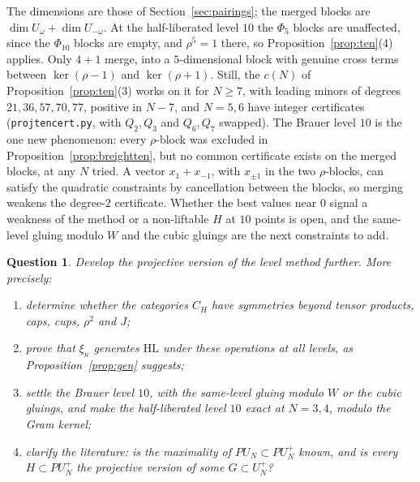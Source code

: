\documentclass[11pt]{amsart}
\newtheorem{question}[theorem]{Question}
\theoremstyle{definition}
\theoremstyle{remark}
\theoremstyle{plain}
\numberwithin{equation}{section}
\numberwithin{table}{section}
\newcommand{\HL}{\mathrm{HL}}
\begin{document}
The dimensions are those of Section~\ref{sec:pairings}; the merged blocks are $\dim U_\omega+\dim U_{-\omega}$. At the half-liberated level $10$ the $\Phi_5$ blocks are unaffected, since the $\Phi_{10}$ blocks are empty, and $\rho^5=1$ there, so Proposition~\ref{prop:ten}(4) applies. Only $4+1$ merge, into a $5$-dimensional block with genuine cross terms between $\ker(\rho-1)$ and $\ker(\rho+1)$. Still, the $c(N)$ of Proposition~\ref{prop:ten}(3) works on it for $N\ge7$, with leading minors of degrees $21,36,57,70,77$, positive in $N-7$, and $N=5,6$ have integer certificates (\texttt{projtencert.py}, with $Q_2,Q_3$ and $Q_6,Q_7$ swapped). The Brauer level $10$ is the one new phenomenon: every $\rho$-block was excluded in Proposition~\ref{prop:breightten}, but no common certificate exists on the merged blocks, at any $N$ tried. A vector $x_1+x_{-1}$, with $x_{\pm1}$ in the two $\rho$-blocks, can satisfy the quadratic constraints by cancellation between the blocks, so merging weakens the degree-$2$ certificate. Whether the best values near $0$ signal a weakness of the method or a non-liftable $H$ at $10$ points is open, and the same-level gluing modulo $W$ and the cubic gluings are the next constraints to add.

\begin{question}\label{qu:projective}
Develop the projective version of the level method further. More precisely:
\begin{enumerate}
\item determine whether the categories $C_H$ have symmetries beyond tensor products, caps, cups, $\rho^2$ and $J$;
\item prove that $\xi_\kappa$ generates $\HL$ under these operations at all levels, as Proposition~\ref{prop:gen} suggests;
\item settle the Brauer level $10$, with the same-level gluing modulo $W$ or the cubic gluings, and make the half-liberated level $10$ exact at $N=3,4$, modulo the Gram kernel;
\item clarify the literature: is the maximality of $PU_N\subset PU_N^+$ known, and is every $H\subset PU_N^+$ the projective version of some $G\subset U_N^+$?
\end{enumerate}
\end{question}
\end{document}
